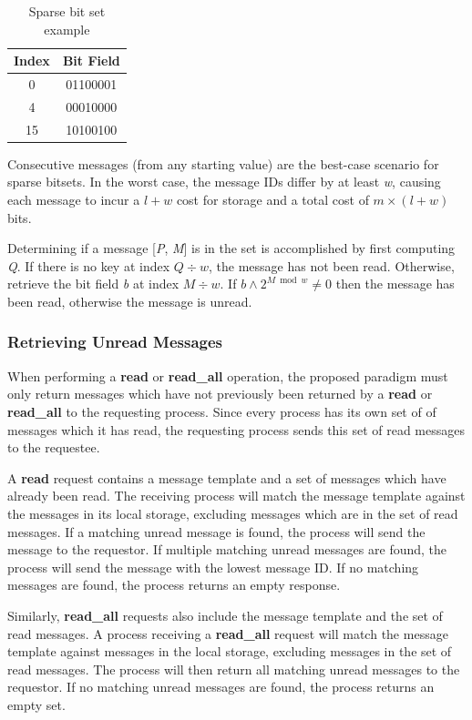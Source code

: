 \documentclass[lnicst]{svmultln}
\begin{document}
\begin{table}
\centering
\caption{Sparse bit set example}
\begin{tabular}{|c|c|} \hline
Index & Bit Field \\ \hline
0 & 01100001 \\ \hline
4 & 00010000 \\ \hline
15 & 10100100 \\ \hline
\end{tabular}
\label{fig:bitset}
\end{table}

Consecutive messages (from any starting value) are the best-case scenario for sparse bitsets. In the worst case, the message IDs differ by at least \textit{w}, causing each message to incur a $l + w$ cost for storage and a total cost of $m \times (l + w)$ bits.

Determining if a message [\textit{P}, \textit{M}] is in the set is accomplished by first computing \textit{Q}. If there is no key at index $Q \div w$, the message has not been read. Otherwise, retrieve the bit field \textit{b} at index $M \div w$. If $b \wedge 2^{M \bmod w} \neq 0$ then the message has been read, otherwise the message is unread.
    
\subsubsection{Retrieving Unread Messages}

When performing a \textbf{read} or \textbf{read\_all} operation, the proposed paradigm must only return messages which have not previously been returned by a \textbf{read} or \textbf{read\_all} to the requesting process. Since every process has its own set of of messages which it has read, the requesting process sends this set of read messages to the requestee.

A \textbf{read} request contains a message template and a set of messages which have already been read. The receiving process will match the message template against the messages in its local storage, excluding messages which are in the set of read messages. If a matching unread message is found, the process will send the message to the requestor. If multiple matching unread messages are found, the process will send the message with the lowest message ID. If no matching messages are found, the process returns an empty response.

Similarly, \textbf{read\_all} requests also include the message template and the set of read messages. A process receiving a \textbf{read\_all} request will match the message template against messages in the local storage, excluding messages in the set of read messages. The process will then return all matching unread messages to the requestor. If no matching unread messages are found, the process returns an empty set.
\end{document}
